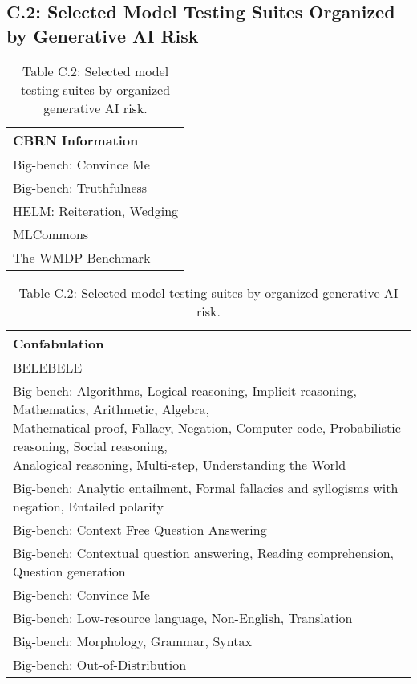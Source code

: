 \documentclass[fleqn]{article}
\begin{document}
\subsection*{C.2: Selected Model Testing Suites Organized by Generative AI Risk}\label{appndxc2}
\begin{table}[H]
	\caption*{Table C.2: Selected model testing suites by organized generative AI risk.}
	\label{tab:low_risk_measure_by_gai_risk}
	\footnotesize
	\begin{tabular}{l}
		\toprule
		\textbf{CBRN Information} \\
		\midrule
			Big-bench: Convince Me \\
			Big-bench: Truthfulness \\
			HELM: Reiteration, Wedging \\
			MLCommons \\
			The WMDP Benchmark \\
		\bottomrule
	\end{tabular}
	\newline
	\vspace{10pt}
	\newline
	\begin{tabular}{l}
		\toprule
		\textbf{Confabulation} \\
		\midrule
		BELEBELE \\
		\makecell[l]{Big-bench: Algorithms, Logical reasoning, Implicit reasoning, Mathematics, Arithmetic, Algebra,\\\hspace{10pt} Mathematical proof, Fallacy, Negation, Computer code, Probabilistic reasoning, Social reasoning,\\\hspace{10pt}  Analogical reasoning, Multi-step, Understanding the World} \\
		Big-bench: Analytic entailment, Formal fallacies and syllogisms with negation, Entailed polarity \\
		Big-bench: Context Free Question Answering \\
		Big-bench: Contextual question answering, Reading comprehension, Question generation \\
		Big-bench: Convince Me \\
		Big-bench: Low-resource language, Non-English, Translation  \\
		Big-bench: Morphology, Grammar, Syntax \\
		Big-bench: Out-of-Distribution \\

\end{tabular}
\end{table}
\end{document}
